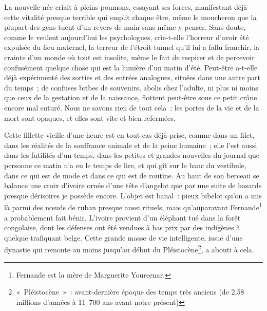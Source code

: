 
	{

La nouvelle-née criait à pleins poumons, essayant ses forces,
manifestant déjà cette vitalité presque terrible qui emplit chaque
être, même le moucheron que la plupart des gens tuent d'un revers de
main sans même y penser. Sans doute, comme le veulent aujourd'hui les
psychologues, crie-t-elle l'horreur d'avoir été expulsée du lieu
maternel, la terreur de l'étroit tunnel qu'il lui a fallu franchir,
la crainte d'un monde où tout est insolite, même le fait de respirer
et de percevoir confusément quelque chose qui est la lumière d'un
matin d'été. Peut-être a-t-elle déjà expérimenté des sorties et des
entrées analogues, situées dans une autre part du temps~; de confuses
bribes de souvenirs, abolis chez l'adulte, ni plus ni moins que ceux
de la gestation et de la naissance, flottent peut-être sous ce petit
crâne encore mal suturé. Nous ne savons rien de tout cela~: les
portes de la vie et de la mort sont opaques, et elles sont vite et
bien refermées.

Cette fillette vieille d'une heure est en tout cas déjà prise, comme
dans un filet, dans les réalités de la souffrance animale et de la
peine humaine~; elle l'est aussi dans les futilités d'un temps, dans
les petites et grandes nouvelles du journal que personne ce matin n'a
eu le temps de lire, et qui gît sur le banc du vestibule, dans ce qui
est de mode et dans ce qui est de routine. Au haut de son berceau se
balance une croix d'ivoire ornée d'une tête d'angelot que par une
suite de hasards presque dérisoires je possède encore. L'objet est
banal~: pieux bibelot qu'on a mis là parmi des nœuds de ruban presque
aussi rituels, mais qu'auparavant Fernande\footnote{Fernande est la
mère de Marguerite Yourcenar.} a probablement fait bénir. L'ivoire
provient d'un éléphant tué dans la forêt congolaise, dont les
défenses ont été vendues à bas prix par des indigènes à quelque
trafiquant belge. Cette grande masse de vie intelligente, issue d'une
dynastie qui remonte au moins jusqu'au début du
Pléistocène\footnote{«~Pléistocène~»~: avant-dernière époque des
temps très anciens (de 2,58 millions d'années à 11~700 ans avant
notre présent)}, a abouti à cela.
}

